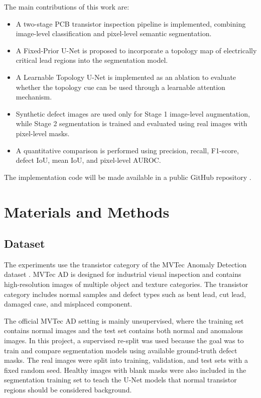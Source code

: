 \documentclass[conference,a4paper]{IEEEtran}
\begin{document}
The main contributions of this work are:
\begin{itemize}
    \item A two-stage PCB transistor inspection pipeline is implemented, combining image-level classification and pixel-level semantic segmentation.
    \item A Fixed-Prior U-Net is proposed to incorporate a topology map of electrically critical lead regions into the segmentation model.
    \item A Learnable Topology U-Net is implemented as an ablation to evaluate whether the topology cue can be used through a learnable attention mechanism.
    \item Synthetic defect images are used only for Stage 1 image-level augmentation, while Stage 2 segmentation is trained and evaluated using real images with pixel-level masks.
    \item A quantitative comparison is performed using precision, recall, F1-score, defect IoU, mean IoU, and pixel-level AUROC.
\end{itemize}

The implementation code will be made available in a public GitHub repository \cite{repo2026}.

\section{Materials and Methods}

\subsection{Dataset}

The experiments use the transistor category of the MVTec Anomaly Detection dataset \cite{bergmann2019mvtec,bergmann2021mvtec}. MVTec AD is designed for industrial visual inspection and contains high-resolution images of multiple object and texture categories. The transistor category includes normal samples and defect types such as bent lead, cut lead, damaged case, and misplaced component.

The official MVTec AD setting is mainly unsupervised, where the training set contains normal images and the test set contains both normal and anomalous images. In this project, a supervised re-split was used because the goal was to train and compare segmentation models using available ground-truth defect masks. The real images were split into training, validation, and test sets with a fixed random seed. Healthy images with blank masks were also included in the segmentation training set to teach the U-Net models that normal transistor regions should be considered background.
\end{document}
